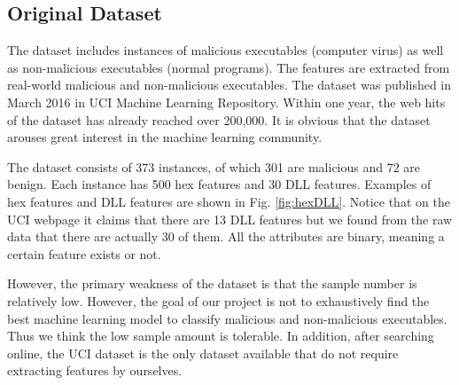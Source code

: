 \documentclass[11pt]{article}
\begin{document}
\subsection{Original Dataset}
The dataset includes instances of malicious executables (computer virus) as well as non-malicious executables (normal programs). The features are extracted from real-world malicious and non-malicious executables. The dataset was published in March 2016 in UCI Machine Learning Repository. Within one year, the web hits of the dataset has already reached over 200,000. It is obvious that the dataset arouses great interest in the machine learning community.

The dataset consists of 373 instances, of which 301 are malicious and 72 are benign. Each instance has 500 hex features and 30 DLL features. Examples of hex features and DLL features are shown in Fig. \ref{fig:hexDLL}. Notice that on the UCI webpage it claims that there are 13 DLL features but we found from the raw data that there are actually 30 of them. All the attributes are binary, meaning a certain feature exists or not. 

However, the primary weakness of the dataset is that the sample number is relatively low. However, the goal of our project is not to exhaustively find the best machine learning model to classify malicious and non-malicious executables. Thus we think the low sample amount is tolerable. In addition, after searching online, the UCI dataset is the only dataset available that do not require extracting features by ourselves.
\end{document}
